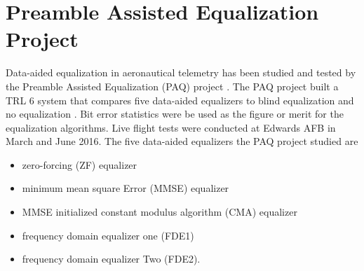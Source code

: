 \section{Preamble Assisted Equalization Project}
Data-aided equalization in aeronautical telemetry has been studied and tested by the Preamble Assisted Equalization (PAQ) project \cite{paq-phase1-report:2014}.
The PAQ project built a TRL 6 system that compares five data-aided equalizers to blind equalization and no equalization \cite{frerkingjpl}.
Bit error statistics were be used as the figure or merit for the equalization algorithms.
Live flight tests were conducted at Edwards AFB in March and June 2016.
The five data-aided equalizers the PAQ project studied are
\begin{itemize}
\item zero-forcing (ZF) equalizer
\item minimum mean square Error (MMSE) equalizer
\item MMSE initialized constant modulus algorithm (CMA) equalizer
\item frequency domain equalizer one (FDE1)
\item frequency domain equalizer Two (FDE2).
\end{itemize}
